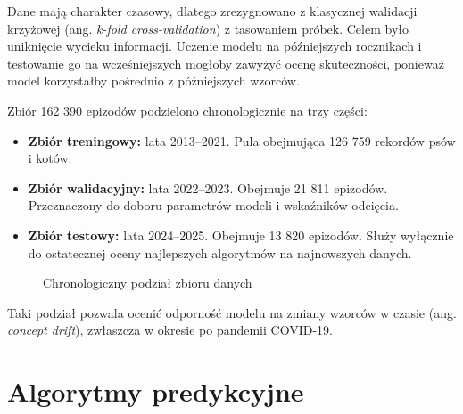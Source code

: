 Dane mają charakter czasowy, dlatego zrezygnowano z klasycznej walidacji krzyżowej (ang. \emph{k-fold cross-validation}) z tasowaniem próbek. Celem było uniknięcie wycieku informacji. Uczenie modelu na późniejszych rocznikach i testowanie go na wcześniejszych mogłoby zawyżyć ocenę skuteczności, ponieważ model korzystałby pośrednio z późniejszych wzorców.

Zbiór 162 390 epizodów podzielono chronologicznie na trzy części:

\begin{itemize}\itemsep2pt
\item \textbf{Zbiór treningowy:} lata 2013--2021. Pula obejmująca 126 759 rekordów psów i kotów.
\item \textbf{Zbiór walidacyjny:} lata 2022--2023. Obejmuje 21 811 epizodów. Przeznaczony do doboru parametrów modeli i wskaźników odcięcia.
\item \textbf{Zbiór testowy:} lata 2024--2025. Obejmuje 13 820 epizodów. Służy wyłącznie do ostatecznej oceny najlepszych algorytmów na najnowszych danych.
\end{itemize}

\begin{figure}[htbp]
\centering
{}
\caption{Chronologiczny podział zbioru danych}
\label{fig:podzial-chronologiczny}
\end{figure}

Taki podział pozwala ocenić odporność modelu na zmiany wzorców w czasie (ang. \emph{concept drift}), zwłaszcza w okresie po pandemii COVID-19.

\section{Algorytmy predykcyjne}
\label{sec:algorytmy-predykcyjne}

